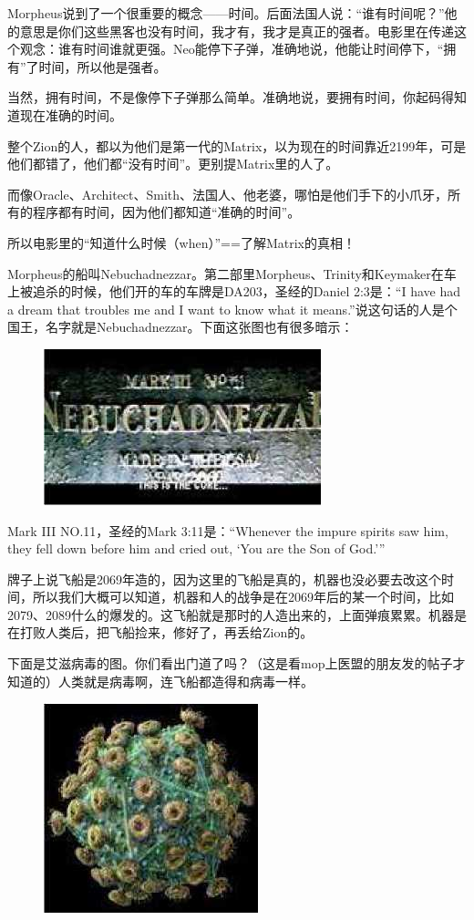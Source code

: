 \documentclass{ctexart}
\begin{document}
Morpheus说到了一个很重要的概念——时间。后面法国人说：“谁有时间呢？”他的意思是你们这些黑客也没有时间，我才有，我才是真正的强者。电影里在传递这个观念：谁有时间谁就更强。Neo能停下子弹，准确地说，他能让时间停下，“拥有”了时间，所以他是强者。

当然，拥有时间，不是像停下子弹那么简单。准确地说，要拥有时间，你起码得知道现在准确的时间。

整个Zion的人，都以为他们是第一代的Matrix，以为现在的时间靠近2199年，可是他们都错了，他们都“没有时间”。更别提Matrix里的人了。

而像Oracle、Architect、Smith、法国人、他老婆，哪怕是他们手下的小爪牙，所有的程序都有时间，因为他们都知道“准确的时间”。

所以电影里的“知道什么时候（when）”==了解Matrix的真相！

Morpheus的船叫Nebuchadnezzar。第二部里Morpheus、Trinity和Keymaker在车上被追杀的时候，他们开的车的车牌是DA203，圣经的Daniel 2:3是：“I have had a dream that troubles me and I want to know what it means.”说这句话的人是个国王，名字就是Nebuchadnezzar。下面这张图也有很多暗示：

\begin{figure}[htb]
\centering
\includegraphics[width=0.5\linewidth]{fig/read_Matrix-27}
\end{figure}

Mark III NO.11，圣经的Mark 3:11是：“Whenever the impure spirits saw him, they fell down before him and cried out, `You are the Son of God.'”

牌子上说飞船是2069年造的，因为这里的飞船是真的，机器也没必要去改这个时间，所以我们大概可以知道，机器和人的战争是在2069年后的某一个时间，比如2079、2089什么的爆发的。这飞船就是那时的人造出来的，上面弹痕累累。机器是在打败人类后，把飞船捡来，修好了，再丢给Zion的。

下面是艾滋病毒的图。你们看出门道了吗？（这是看mop上医盟的朋友发的帖子才知道的）人类就是病毒啊，连飞船都造得和病毒一样。

\begin{figure}[htb]
\centering
\includegraphics[width=0.5\linewidth]{fig/read_Matrix-28}
\end{figure}
\end{document}

